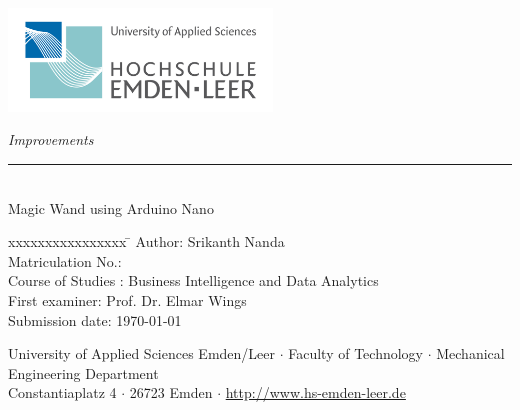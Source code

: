 %
%

\begin{titlepage}
	
	\begin{flushleft} 
		\includegraphics[width=7cm]{Images/General/Logo.png}
	\end{flushleft} 
	
	\begin{flushright}
		\vspace{2cm}
		\LARGE \textsl{Improvements}\\
		\rule{0.6\textwidth}{0.4pt} ~\\
		\vspace{0.5cm}
		\textsf{\huge Magic Wand using Arduino Nano}\\
	\end{flushright}
	
	\vspace{1.5cm}
	\large
	\begin{tabbing}
		xxxxxxxxxxxxxxxx \= \kill
		Author:\> Srikanth Nanda\\
		Matriculation No.: \\[0.3cm]
		Course of Studies : \> Business Intelligence and Data Analytics \\ [0.5cm]
		First examiner: \> Prof. Dr. Elmar Wings \\
		Submission date: \> \today \\
	\end{tabbing}
	
	\vspace{3cm}
	\large
	\begin{center}
		University of Applied Sciences Emden/Leer $\cdot$ 
		Faculty of Technology $\cdot$ 
		Mechanical Engineering Department \\
		Constantiaplatz 4 $\cdot$ 
		26723 Emden $\cdot$ 
		\url{http://www.hs-emden-leer.de}
	\end{center}
	
\end{titlepage}
